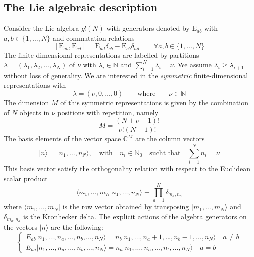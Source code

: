 \documentclass[11pt]{article}
\numberwithin{equation}{section}
\numberwithin{equation}{subsection}
\newcommand{\EE}{\mathrm{E}}
\newcommand{\twoj}{\nu}
\begin{document}
\subsection{The Lie algebraic description}


Consider the Lie algebra $gl(N)$ with generators denoted by $\EE_{ab}$ with $a,b\in \{1,\ldots,N\}$ and commutation relations
\begin{equation}\label{eq:comgl}
\left[\EE_{ab},\EE_{cd}\right]=\EE_{ad}\delta_{cb}-\EE_{cb}\delta_{ad}\qquad \forall a,b\in \{1,\ldots,N\}
\end{equation}
The finite-dimensional representations are labelled by partitions $\lambda=(\lambda_1,\lambda_2,\ldots,\lambda_N)$ of $\nu$ with $\lambda_i\in \mathbb{N}$ and $\sum_{i=1}^N \lambda_i = \nu$. We assume $\lambda_i\geq \lambda_{i+1}$ without loss of generality.
We are interested in the {\em symmetric} finite-dimensional representations with 
\begin{equation}\label{eq:dynkin}
    \lambda=(\twoj,0,\ldots,0) \qquad\text{where}\qquad \twoj\in\mathbb{N}
\end{equation} 
The dimension $M$ of this symmetric representations is given by the combination of $N$ objects in $\twoj$ positions with repetition, namely
\begin{equation}
	M= \frac{(N+\twoj-1)!}{\twoj  !(N-1)!}
\end{equation} 
The basis elements of the vector space $\mathbb{C}^{M}$ are the column vectors 
\begin{equation}
  |n\rangle=  |n_{1},\ldots,n_{N}\rangle,\quad \text{with}\quad n_{i}\in\mathbb{N}_{0}\quad \text{sucht that}\quad \sum_{i=1}^{N}n_{i}=\nu
\end{equation}
This basis vector satisfy the orthogonality relation with respect to the Euclidean scalar product 
\begin{equation}\label{ortho}
    \langle m_{1},\ldots,m_{N}|n_{1},\ldots,n_{N}\rangle=\prod_{a=1}^{N}\delta_{m_{a},n_{a}}
\end{equation}
where  $ \langle m_{1},\ldots,m_{N}|$ is the row vector obtained by transposing $|m_{1},\ldots,m_{N}\rangle$ and $\delta_{m_{a},n_{a}}$ is the Kronhecker delta. 
The explicit actions of the algebra generators on the vectors $|n\rangle$ are the following:
\begin{equation}\label{actionE}
	\begin{cases}
		E_{ab}|n_{1},\ldots,n_{a},\ldots,n_{b},\ldots,n_{N}\rangle =n_{b}|n_{1},\ldots,n_{a}+1,\ldots,n_{b}-1,\ldots,n_{N}\rangle\quad a\neq b\\[0.1cm]
		E_{aa}|n_{1},\ldots,n_{a},\ldots,n_{b},\ldots,n_{N}\rangle = n_{a} |n_{1},\ldots,n_{a},\ldots,n_{b},\ldots,n_{N}\rangle\quad a=b
	\end{cases}
\end{equation}  
\end{document}

